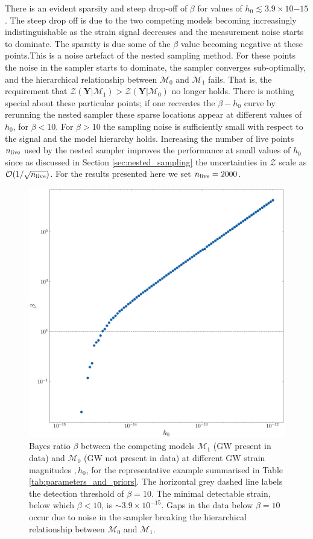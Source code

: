 \documentclass[fleqn,usenatbib,useAMS]{mnras}
\begin{document}
There is an evident sparsity and steep drop-off of $\beta$ for values of $h_0 \lesssim 3.9 \times10{-15}$. The steep drop off is due to the two competing models becoming increasingly indistinguishable as the strain signal decreases and the measurement noise starts to dominate. The sparsity is due some of the $\beta$ value becoming negative at these points.This is a noise artefact of the nested sampling method. For these points the noise in the sampler starts to dominate, the sampler converges sub-optimally, and the hierarchical relationship between $\mathcal{M}_0$ and  $\mathcal{M}_1$ fails. That is, the requirement that $\mathcal{Z}(\boldsymbol{Y} | \mathcal{M}_1) > \mathcal{Z}(\boldsymbol{Y} | \mathcal{M}_0)$ no longer holds. There is nothing special about these particular points; if one recreates the $\beta - h_0$ curve by rerunning the nested sampler these sparse locations appear at different values of $h_0$, for $\beta < 10$. For $\beta > 10$ the sampling noise is sufficiently small with respect to the signal and the model hierarchy holds. Increasing the number of live points $n_{\rm live}$ used by the nested sampler improves the performance at small values of $h_0$ since as discussed in Section \ref{sec:nested_sampling} the uncertainties in $\mathcal{Z}$ scale as $\mathcal{O}(1/ \sqrt{n_{\rm live}})$. For the results presented here we set $n_{\rm live} =2000$. 
\begin{figure}
	\includegraphics[width=\columnwidth]{images/CanonicalBayesPlot2000}
	\caption{Bayes ratio $\beta$ between the competing models $\mathcal{M}_1$ (GW present in data) and $\mathcal{M}_0$ (GW not present in data) at different GW strain magnitudes $,h_0$, for the representative example summarised in Table \ref{tab:parameters_and_priors}. The horizontal grey dashed line labels the detection threshold of $\beta = 10$. The minimal detectable strain, below which $\beta < 10$, is $\sim 3.9 \times 10^{-15}$. Gaps in the data below $\beta=10$ occur due to noise in the sampler breaking the hierarchical relationship between $\mathcal{M}_0$ and $\mathcal{M}_1$.}
	\label{fig:bayes}
\end{figure}
\end{document}

